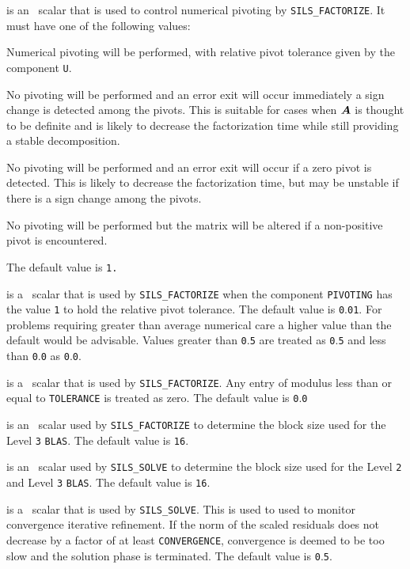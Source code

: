 \documentclass{galahad}
\newcommand{\packagename}{SILS}
\begin{document}
\begin{description}
 is an \integer\ scalar that is used to control numerical 
pivoting by {\tt \packagename\_FACTORIZE}. It must have one of the 
following values: 

\begin{description} 
  Numerical pivoting will be performed, with relative pivot  
tolerance given by the component {\tt U}.  
 
  No pivoting will be performed and an error exit will occur 
immediately a sign change is detected among the pivots. This is 
suitable for cases when ${\bm{A}}$  is thought to be definite and is likely to 
decrease the factorization time while still providing a stable 
decomposition. 
 
  No pivoting will be performed and an error exit will occur if a 
zero pivot is detected. This is likely to decrease the factorization 
time, but may be unstable if there is a sign change among the pivots. 
 
  No pivoting will be performed but the matrix will be altered 
if a non-positive pivot is encountered. 

\end{description} 

\noindent The default value is {\tt 1.} 
 
 is a \realdp\ scalar that is used by {\tt \packagename\_FACTORIZE} 
when the 
component {\tt PIVOTING} has the value {\tt 1} to hold the relative pivot 
tolerance.  The default value is {\tt 0}.{\tt 01}.  For problems requiring 
greater 
than average numerical care a higher value than the default would be 
advisable. Values greater than {\tt 0}.{\tt 5} are treated as {\tt 0}.{\tt 5} 
and less than {\tt 0}.{\tt 0} as {\tt 0}.{\tt 0}. 
 
 is a \realdp\ scalar that is used by 
{\tt \packagename\_FACTORIZE}.  
Any entry of modulus less than or equal to {\tt TOLERANCE} is treated as zero. 
The default value is {\tt 0}.{\tt 0}
 
 is an \integer\ scalar used by 
{\tt \packagename\_FACTORIZE} 
to determine 
the block size used for the Level {\tt 3} {\tt BLAS}.  The default value 
is {\tt 16}. 
 
 is an \integer\ scalar used by {\tt \packagename\_SOLVE} 
to determine the block size used for the Level {\tt 2} and Level {\tt 3} 
{\tt BLAS}.  The default value is {\tt 16}. 
 
 is a \realdp\ scalar that is used by 
{\tt \packagename\_SOLVE}.  This is used to used to monitor convergence 
iterative refinement. If the norm of
the scaled residuals does not decrease by a factor of at least
{\tt CONVERGENCE}, convergence is deemed to be too slow and the
solution phase is terminated.
The default value is {\tt 0}.{\tt 5}. 


\end{description}
\end{document}
